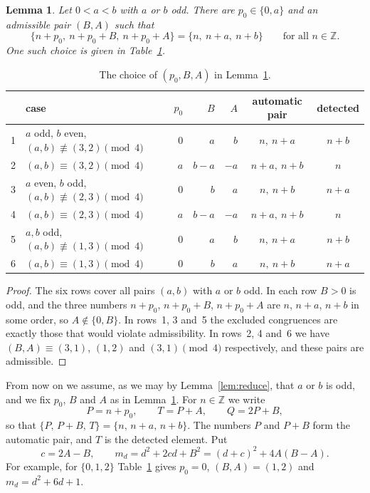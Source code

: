 \documentclass[11pt]{amsart}
\newtheorem{lemma}[theorem]{Lemma}
\theoremstyle{remark}
\theoremstyle{definition}
\numberwithin{equation}{section}
\newcommand{\Z}{\mathbb{Z}}
\begin{document}
\begin{lemma}\label{lem:choice}
Let $0<a<b$ with $a$ or $b$ odd. There are $p_0\in\{0,a\}$ and an admissible pair $(B,A)$ such that
\[
\{n+p_0,\ n+p_0+B,\ n+p_0+A\}=\{n,\ n+a,\ n+b\}\qquad\text{for all }n\in\Z.
\]
One such choice is given in Table~\ref{tab:choice}.
\end{lemma}

\begin{table}[h]
\centering
\begin{tabular}{llrrrcc}
\toprule
& case & $p_0$ & $B$ & $A$ & automatic pair & detected\\
\midrule
1 & $a$ odd, $b$ even, $(a,b)\not\equiv(3,2)\pmod 4$ & $0$ & $a$ & $b$ & $n,\ n+a$ & $n+b$\\
2 & $(a,b)\equiv(3,2)\pmod 4$ & $a$ & $b-a$ & $-a$ & $n+a,\ n+b$ & $n$\\
3 & $a$ even, $b$ odd, $(a,b)\not\equiv(2,3)\pmod 4$ & $0$ & $b$ & $a$ & $n,\ n+b$ & $n+a$\\
4 & $(a,b)\equiv(2,3)\pmod 4$ & $a$ & $b-a$ & $-a$ & $n+a,\ n+b$ & $n$\\
5 & $a,b$ odd, $(a,b)\not\equiv(1,3)\pmod 4$ & $0$ & $a$ & $b$ & $n,\ n+a$ & $n+b$\\
6 & $(a,b)\equiv(1,3)\pmod 4$ & $0$ & $b$ & $a$ & $n,\ n+b$ & $n+a$\\
\bottomrule
\end{tabular}
\caption{The choice of $(p_0,B,A)$ in Lemma~\ref{lem:choice}.}
\label{tab:choice}
\end{table}

\begin{proof}
The six rows cover all pairs $(a,b)$ with $a$ or $b$ odd. In each row $B>0$ is odd, and the three numbers $n+p_0$, $n+p_0+B$, $n+p_0+A$ are $n$, $n+a$, $n+b$ in some order, so $A\notin\{0,B\}$. In rows~1, 3 and~5 the excluded congruences are exactly those that would violate admissibility. In rows~2, 4 and~6 we have $(B,A)\equiv(3,1)$, $(1,2)$ and $(3,1)\pmod 4$ respectively, and these pairs are admissible.
\end{proof}

From now on we assume, as we may by Lemma~\ref{lem:reduce}, that $a$ or $b$ is odd, and we fix $p_0$, $B$ and $A$ as in Lemma~\ref{lem:choice}. For $n\in\Z$ we write
\begin{equation}\label{eq:PTQ}
P=n+p_0,\qquad T=P+A,\qquad Q=2P+B,
\end{equation}
so that $\{P,\,P+B,\,T\}=\{n,\,n+a,\,n+b\}$. The numbers $P$ and $P+B$ form the automatic pair, and $T$ is the detected element. Put
\begin{equation}\label{eq:md}
c=2A-B,\qquad m_d=d^2+2cd+B^2=(d+c)^2+4A(B-A).
\end{equation}
For example, for $\{0,1,2\}$ Table~\ref{tab:choice} gives $p_0=0$, $(B,A)=(1,2)$ and $m_d=d^2+6d+1$.
\end{document}
